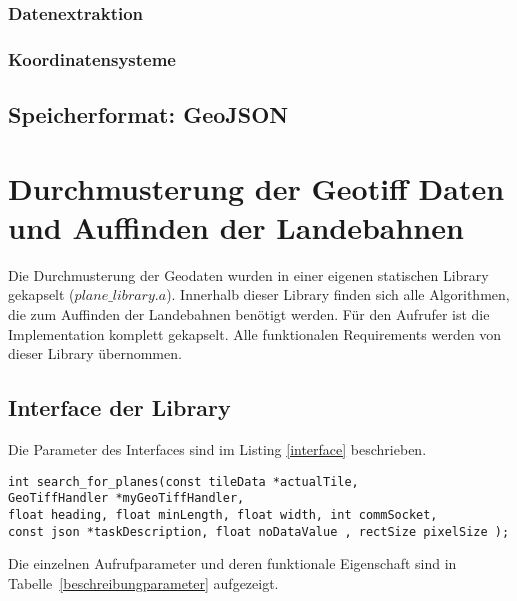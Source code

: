 \documentclass[10pt,a4paper]{report}
\begin{document}
\subsection{Datenextraktion}
\subsection{Koordinatensysteme}
\section{Speicherformat: GeoJSON}

\chapter{Durchmusterung der Geotiff Daten und Auffinden der Landebahnen}
Die Durchmusterung der Geodaten wurden in einer eigenen statischen Library gekapselt ($plane\_library.a$). Innerhalb dieser Library finden sich alle Algorithmen, die zum Auffinden der Landebahnen benötigt werden. Für den Aufrufer ist die Implementation komplett gekapselt. Alle funktionalen Requirements werden von dieser Library übernommen.


\section{Interface der Library}

Die Parameter des Interfaces sind im Listing \ref{interface} beschrieben.

\begin{lstlisting}[caption=Interface Beschreibung, label=interface]
int search_for_planes(const tileData *actualTile, 
GeoTiffHandler *myGeoTiffHandler, 
float heading, float minLength, float width, int commSocket,
const json *taskDescription, float noDataValue , rectSize pixelSize );
\end{lstlisting}

Die einzelnen Aufrufparameter und deren funktionale Eigenschaft sind in Tabelle~\ref{beschreibungparameter} aufgezeigt.
\end{document}
